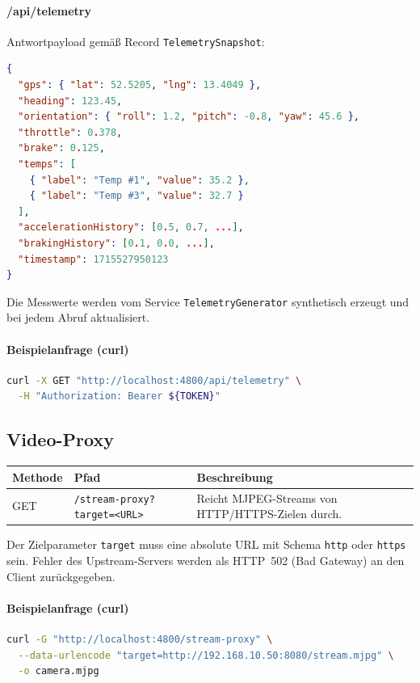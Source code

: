 \documentclass[a4paper,11pt]{article}
\begin{document}
\paragraph{/api/telemetry}
Antwortpayload gemäß Record \texttt{TelemetrySnapshot}:
\begin{lstlisting}[language=json]
{
  "gps": { "lat": 52.5205, "lng": 13.4049 },
  "heading": 123.45,
  "orientation": { "roll": 1.2, "pitch": -0.8, "yaw": 45.6 },
  "throttle": 0.378,
  "brake": 0.125,
  "temps": [
    { "label": "Temp #1", "value": 35.2 },
    { "label": "Temp #3", "value": 32.7 }
  ],
  "accelerationHistory": [0.5, 0.7, ...],
  "brakingHistory": [0.1, 0.0, ...],
  "timestamp": 1715527950123
}
\end{lstlisting}
Die Messwerte werden vom Service \texttt{TelemetryGenerator} synthetisch erzeugt und bei jedem Abruf aktualisiert.

\paragraph{Beispielanfrage (curl)}
\begin{lstlisting}[language=bash]
curl -X GET "http://localhost:4800/api/telemetry" \
  -H "Authorization: Bearer ${TOKEN}"
\end{lstlisting}

\subsection{Video-Proxy}
\begin{longtable}{p{3.2cm}p{3cm}p{7.5cm}}
\textbf{Methode} & \textbf{Pfad} & \textbf{Beschreibung}\\\hline
GET & \texttt{/stream-proxy?target=<URL>} & Reicht MJPEG-Streams von HTTP/HTTPS-Zielen durch.\\
\end{longtable}
Der Zielparameter \texttt{target} muss eine absolute URL mit Schema \texttt{http} oder \texttt{https} sein.
Fehler des Upstream-Servers werden als HTTP~502 (Bad Gateway) an den Client zurückgegeben.

\paragraph{Beispielanfrage (curl)}
\begin{lstlisting}[language=bash]
curl -G "http://localhost:4800/stream-proxy" \
  --data-urlencode "target=http://192.168.10.50:8080/stream.mjpg" \
  -o camera.mjpg
\end{lstlisting}
\end{document}
